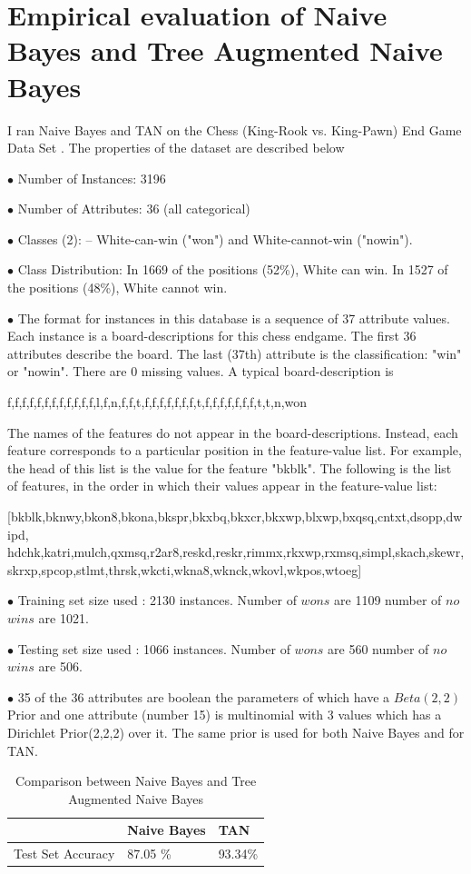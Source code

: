 \newpage
\section{Empirical evaluation of Naive Bayes and Tree Augmented Naive Bayes}
\label{sec:eval}

I ran Naive Bayes and TAN on the Chess (King-Rook vs. King-Pawn) End Game Data Set \cite{chessEndGame}. The properties of the dataset are described below

$\bullet$ Number of Instances: 3196 

$\bullet$ Number of Attributes: 36 (all categorical)

$\bullet$ Classes (2):  -- White-can-win ("won") and White-cannot-win ("nowin").

$\bullet$ Class Distribution:
    In 1669 of the positions (52\%), White can win.
    In 1527 of the positions (48\%), White cannot win.

$\bullet$ The format for instances in this database is a sequence of 37 attribute values.
Each instance is a board-descriptions for this chess endgame.  The first
36 attributes describe the board.  The last (37th) attribute is the
classification: "win" or "nowin".  There are 0 missing values.
A typical board-description is

f,f,f,f,f,f,f,f,f,f,f,f,l,f,n,f,f,t,f,f,f,f,f,f,f,t,f,f,f,f,f,f,f,t,t,n,won

The names of the features do not appear in the board-descriptions.
Instead, each feature corresponds to a particular position in the
feature-value list.  For example, the head of this list is the value
for the feature "bkblk".  The following is the list of features, in
the order in which their values appear in the feature-value list:


[bkblk,bknwy,bkon8,bkona,bkspr,bkxbq,bkxcr,bkxwp,blxwp,bxqsq,cntxt,dsopp,dwipd,
 hdchk,katri,mulch,qxmsq,r2ar8,reskd,reskr,rimmx,rkxwp,rxmsq,simpl,skach,skewr,
 skrxp,spcop,stlmt,thrsk,wkcti,wkna8,wknck,wkovl,wkpos,wtoeg]
 
$\bullet$ Training set size used : 2130 instances. Number of $wons$ are  1109
number of $no$ $wins$ are  1021.


$\bullet$ Testing set size used : 1066 instances. Number of $wons$ are  560
number of $no$ $wins$ are  506.

$\bullet$ 35 of the 36 attributes are boolean the parameters of which have a $Beta(2,2)$ Prior and one attribute (number 15) is multinomial with 3 values which has a Dirichlet Prior(2,2,2) over it. The same prior is used for both Naive Bayes and for TAN. 
\begin{table}[h!]
\centering

\begin{tabular}{| m{3cm}| m{2cm} | m{2cm} |} 
\hline
  & Naive Bayes & TAN\\ 
\hline
 Test Set Accuracy & 87.05 \% & 93.34\%\\ 
\hline

\end{tabular}
\label{table:results}
\caption{Comparison between Naive Bayes and Tree Augmented Naive Bayes}
\end{table}


